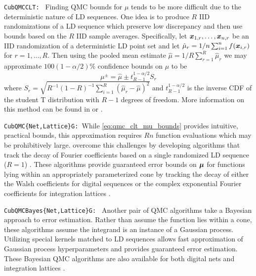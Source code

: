 \documentclass{article}[12pt]
\begin{document}
\texttt{CubQMCCLT: } Finding QMC bounds for $\mu$ tends to be more difficult due to the deterministic nature of LD sequences. One idea is to produce $R$ IID randomizations of a LD sequence which preserve low discrepancy and then use bounds based on the $R$ IID sample averages. Specifically, let $\boldsymbol{x}_{1,r},\dots,\boldsymbol{x}_{n,r}$ be an IID randomization of a deterministic LD point set and let $\hat{\mu}_r = 1/n \sum_{i=1}^n f(\boldsymbol{x}_{i,r})$ for $r=1,\dots,R$. Then using the pooled mean estimate $\hat{\mu} = 1/R \sum_{r=1}^R \hat{\mu}_r$ we may approximate $100(1-\alpha/2)\%$ confidence bounds on $\mu$ to be
\begin{equation}
    \mu^\pm = \hat{\mu} \pm t_{R-1}^{1-\alpha/2}S_r
    \label{eq:qmc_clt_mu_bounds}
\end{equation}
where $S_r = \sqrt{R^{-1}(1-R)^{-1}\sum_{i=1}^R(\hat{\mu}_r - \hat{\mu})^2}$ and $t_{R-1}^{1-\alpha/2}$ is the inverse CDF of the student T distribution with $R-1$ degrees of freedom. More information on this method can be found in \cite[Chapter 17]{mcbook} or \cite{qmc4pde_preprint}.

\texttt{CubQMC\{Net,Lattice\}G: }While \eqref{eq:qmc_clt_mu_bounds} provides intuitive, practical bounds, this approximation requires $Rn$ function evaluations which may be prohibitively large.  \citeauthor{cubqmclattice} overcome this challenges by developing algorithms that track the decay of Fourier coefficients based on a single randomized LD sequence ($R=1$) \cite{adaptive_qmc}. These algorithms provide guaranteed error bounds on $\boldsymbol{\mu}$ for functions lying within an appropriately parameterized cone by tracking the decay of either the Walsh coefficients for digital sequences \cite{cubqmcsobol} or the complex exponential Fourier coefficients for integration lattices \cite{cubqmclattice}.  


\texttt{CubQMCBayes\{Net,Lattice\}G: } Another pair of QMC algorithms take a Bayesian approach to error estimation. Rather than assume the function lies within a cone, these algorithms assume the integrand is an instance of a Gaussian process. Utilizing special kernels matched to LD sequences allows fast approximation of Gaussian process hyperparameters and provides guaranteed error estimation. These Bayesian QMC algorithms are also available for both digital nets  and integration lattices  \cite{cubqmcbayeslattice}.
\end{document}
